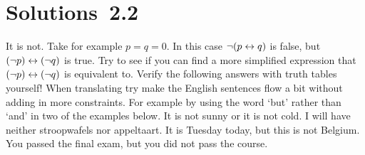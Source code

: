 \section*{Solutions~2.2}%


\begin{solutions}
	\setcounter{solutioncounter}{3}
	\solution It is not. Take for example $p=q=0$. In this case $\lnot(p \leftrightarrow q)$ is false, but $(\lnot p) \leftrightarrow (\lnot q)$ is true. Try to see if you can find a more simplified expression that $(\lnot p) \leftrightarrow (\lnot q)$ is equivalent to.
	\setcounter{solutioncounter}{9}
	\solution Verify the following answers with truth tables yourself!
	\solution When translating try make the English sentences flow a bit without adding in more constraints. For example by using the word `but' rather than `and' in two of the examples below.
	\spart
		It is not sunny or it is not cold.
	\spart
		I will have neither stroopwafels nor appeltaart.
	\spart
		It is Tuesday today, but this is not Belgium.
	\spart
		You passed the final exam, but you did not pass the course.
	
\end{solutions}
